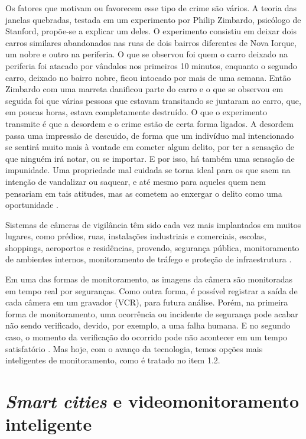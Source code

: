 Os fatores que motivam ou favorecem esse tipo de crime são vários. A teoria das janelas quebradas, testada em um experimento por Philip Zimbardo, psicólogo de Stanford, propõe-se a explicar um deles. O experimento consistiu em deixar dois carros similares abandonados nas ruas de dois bairros diferentes de Nova Iorque, um nobre e outro na periferia. O que se observou foi quem o carro deixado na periferia foi atacado por vândalos nos primeiros 10 minutos, enquanto o segundo carro, deixado no bairro nobre, ficou intocado por mais de uma semana. Então Zimbardo com uma marreta danificou parte do carro e o que se observou em seguida foi que várias pessoas que estavam transitando se juntaram ao carro, que, em poucas horas, estava completamente destruído.  O que o experimento transmite é que a desordem e o crime estão de certa forma ligados. A desordem passa uma impressão de descuido, de forma que um indivíduo mal intencionado se sentirá muito mais à vontade em cometer algum delito, por ter a sensação de que ninguém irá notar, ou se importar. E por isso, há também uma sensação de impunidade. Uma propriedade mal cuidada se torna ideal para os que saem na intenção de vandalizar ou saquear, e até mesmo para aqueles quem nem pensariam em tais atitudes, mas as cometem ao enxergar o delito como uma oportunidade \cite{Wilson1982}.

Sistemas de câmeras de vigilância têm sido cada vez mais implantados em muitos lugares, como prédios, ruas, instalações industriais e comerciais, escolas, shoppings, aeroportos e residências, provendo, segurança pública, monitoramento de ambientes internos, monitoramento de tráfego e proteção de infraestrutura \cite{Puvvadi2015}.

Em uma das formas de monitoramento, as imagens da câmera são monitoradas em tempo real por seguranças. Como outra forma, é possível registrar a saída de cada câmera em um gravador (VCR), para futura análise. Porém, na primeira forma de monitoramento, uma ocorrência ou incidente de segurança pode acabar não sendo verificado, devido, por exemplo, a uma falha humana. E no segundo caso, o momento da verificação do ocorrido pode não acontecer em um tempo satisfatório \cite{Olson2006, RamosLima2019}. Mas hoje, com o avanço da tecnologia, temos opções mais inteligentes de monitoramento, como é tratado no item 1.2.

\section{\textit{Smart cities} e videomonitoramento inteligente}

